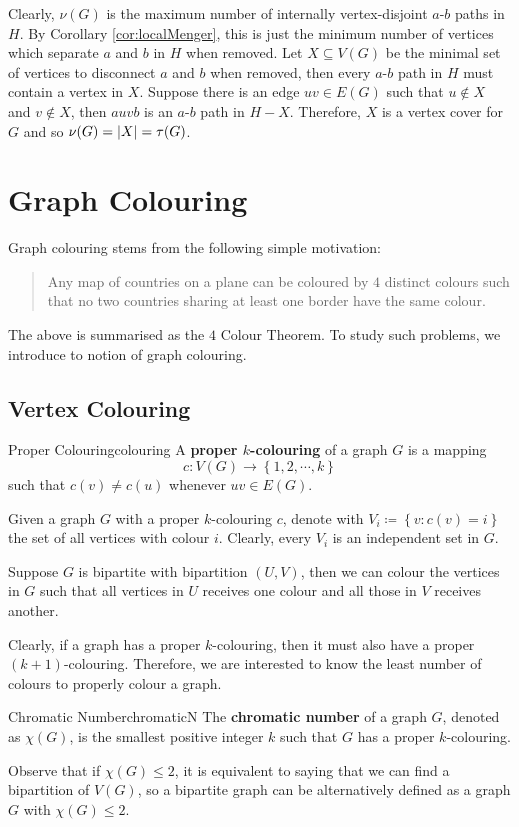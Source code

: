 \documentclass[math]{amznotes}
\theoremstyle{remark}
\newcommand{\0}{\mathbf{0}}
\newcommand{\1}{\mathbf{1}}
\begin{document}
Clearly, $\nu(G)$ is the maximum number of internally vertex-disjoint $a$-$b$ paths in $H$. By Corollary \ref{cor:localMenger}, this is just the minimum number of vertices which separate $a$ and $b$ in $H$ when removed. Let $X \subseteq V(G)$ be the minimal set of vertices to disconnect $a$ and $b$ when removed, then every $a$-$b$ path in $H$ must contain a vertex in $X$. Suppose there is an edge $uv \in E(G)$ such that $u \notin X$ and $v \notin X$, then $auvb$ is an $a$-$b$ path in $H - X$. Therefore, $X$ is a vertex cover for $G$ and so $\nu(G) = {\left\lvert {X} \right\rvert} = \tau(G)$.
\chapter{Graph Colouring}
Graph colouring stems from the following simple motivation:
\begin{quote}
    Any map of countries on a plane can be coloured by $4$ distinct colours such that no two countries sharing at least one border have the same colour.
\end{quote}
The above is summarised as the $4$ Colour Theorem. To study such problems, we introduce to notion of graph colouring.
\section{Vertex Colouring}
\begin{dfnbox}{Proper Colouring}{colouring}
    A {\color{red} \textbf{proper $k$-colouring}} of a graph $G$ is a mapping 
    \begin{equation*}
        c \colon V(G) \to \left\{1, 2, \cdots, k\right\}
    \end{equation*}
    such that $c(v) \neq c(u)$ whenever $uv \in E(G)$.
\end{dfnbox}
Given a graph $G$ with a proper $k$-colouring $c$, denote with $V_i \coloneqq \left\{v \colon c(v) = i\right\}$ the set of all vertices with colour $i$. Clearly, every $V_i$ is an independent set in $G$.

Suppose $G$ is bipartite with bipartition $(U, V)$, then we can colour the vertices in $G$ such that all vertices in $U$ receives one colour and all those in $V$ receives another.

Clearly, if a graph has a proper $k$-colouring, then it must also have a proper $(k + 1)$-colouring. Therefore, we are interested to know the least number of colours to properly colour a graph.
\begin{dfnbox}{Chromatic Number}{chromaticN}
    The {\color{red} \textbf{chromatic number}} of a graph $G$, denoted as $\chi(G)$, is the smallest positive integer $k$ such that $G$ has a proper $k$-colouring.
\end{dfnbox}
Observe that if $\chi(G) \leq 2$, it is equivalent to saying that we can find a bipartition of $V(G)$, so a bipartite graph can be alternatively defined as a graph $G$ with $\chi(G) \leq 2$. 
\end{document}
